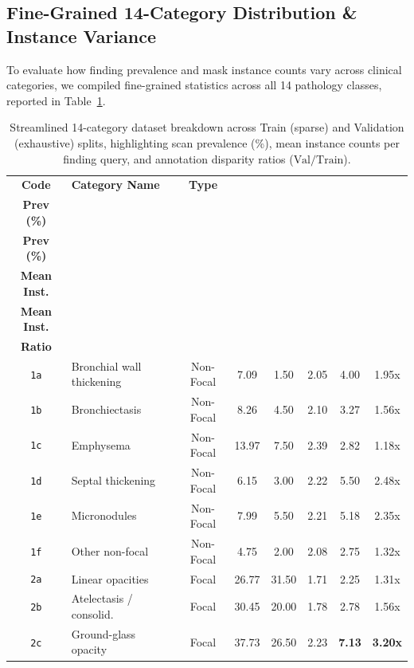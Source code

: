 \documentclass[11pt,a4paper]{article}
\begin{document}
\subsection{Fine-Grained 14-Category Distribution \& Instance Variance}
To evaluate how finding prevalence and mask instance counts vary across clinical categories, we compiled fine-grained statistics across all 14 pathology classes, reported in Table~\ref{tab:category_breakdown}.

\begin{table}[htbp]
\centering
\caption{Streamlined 14-category dataset breakdown across Train (sparse) and Validation (exhaustive) splits, highlighting scan prevalence (\%), mean instance counts per finding query, and annotation disparity ratios ($\text{Val}/\text{Train}$).}
\label{tab:category_breakdown}
\scriptsize
\setlength{\tabcolsep}{3.5pt}
\begin{tabularx}{\linewidth}{clc cc cc c}
\toprule
\textbf{Code} & \textbf{Category Name} & \textbf{Type} & \makecell{\textbf{Train}\\\textbf{Prev (\%)}} & \makecell{\textbf{Val}\\\textbf{Prev (\%)}} & \makecell{\textbf{Train}\\\textbf{Mean Inst.}} & \makecell{\textbf{Val}\\\textbf{Mean Inst.}} & \makecell{\textbf{Disparity}\\\textbf{Ratio}} \\
\midrule
\texttt{1a} & Bronchial wall thickening & Non-Focal & 7.09 & 1.50 & 2.05 & 4.00 & 1.95x \\
\texttt{1b} & Bronchiectasis           & Non-Focal & 8.26 & 4.50 & 2.10 & 3.27 & 1.56x \\
\texttt{1c} & Emphysema                & Non-Focal & 13.97 & 7.50 & 2.39 & 2.82 & 1.18x \\
\texttt{1d} & Septal thickening        & Non-Focal & 6.15 & 3.00 & 2.22 & 5.50 & 2.48x \\
\texttt{1e} & Micronodules             & Non-Focal & 7.99 & 5.50 & 2.21 & 5.18 & 2.35x \\
\texttt{1f} & Other non-focal          & Non-Focal & 4.75 & 2.00 & 2.08 & 2.75 & 1.32x \\
\midrule
\texttt{2a} & Linear opacities         & Focal & 26.77 & 31.50 & 1.71 & 2.25 & 1.31x \\
\texttt{2b} & Atelectasis / consolid.  & Focal & 30.45 & 20.00 & 1.78 & 2.78 & 1.56x \\
\texttt{2c} & Ground-glass opacity     & Focal & 37.73 & 26.50 & 2.23 & \textbf{7.13} & \textbf{3.20x} \\

\end{tabularx}
\end{table}
\end{document}

